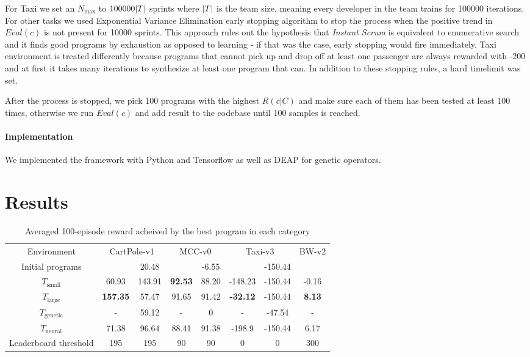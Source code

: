 For Taxi we set an $N_\text{max}$ to $100000 |T|$ sprints where $|T|$ is the team size, meaning every developer in the team trains for 100000 iterations.
For other tasks we used Exponential Variance Elimination \cite{evestop} early stopping algorithm to stop the process when the positive trend in $Eval(c)$ is not present for 10000 sprints.
This approach rules out the hypothesis that \emph{Instant Scrum} is equivalent to enumerative search and it finds good programs by exhaustion as opposed to learning - if that was the case, early stopping would fire immediately.
Taxi environment is treated differently because programs that cannot pick up and drop off at least one passenger are always rewarded with -200 and at first it takes many iterations to synthesize at least one program that can.
In addition to these stopping rules, a hard timelimit was set.

After the process is stopped, we pick 100 programs with the highest $R(c|C)$ and make sure each of them has been tested at least 100 times, otherwise we run $Eval(c)$ and add result to the codebase until 100 samples is reached. 

\paragraph{Implementation}

We implemented the framework with Python and Tensorflow as well as DEAP \cite{deap} for genetic operators.

\newpage
\section{Results}
\label{sec:neurgen-results}

\begin{table*}[]
    \centering
    \begin{tabular}{c|c|c|c|c|c|c|c}
         Environment & \multicolumn{2}{c}{CartPole-v1} & \multicolumn{2}{c}{MCC-v0} & \multicolumn{2}{c}{Taxi-v3} & BW-v2 \\
         Initial programs & & 20.48 & & -6.55 & & -150.44 & \\
         \midrule
         $T_\text{small}$  &    60.93 &    143.91 &     \textbf{92.53} &     88.20 &   -148.23 &   -150.44 &     -0.16\\
         $T_\text{large}$ & \textbf{157.35} &     57.47 &     91.65 &     91.42 &    \textbf{-32.12} &   -150.44 &      \textbf{8.13} \\ 
         $T_\text{genetic}$& - & 59.12 & - & 0 & - & -47.54 & - \\ 
         $T_\text{neural}$ & 71.38 & 96.64 & 88.41 & 91.38 & -198.9 & -150.44 & 6.17 \\
         \midrule
         Leaderboard threshold & 195 & 195 & 90 & 90 & 0 & 0 & 300 \\ 
    \end{tabular}
    \caption{Averaged 100-episode reward acheived by the best program in each category}
    \label{tab:results}
\end{table*}

